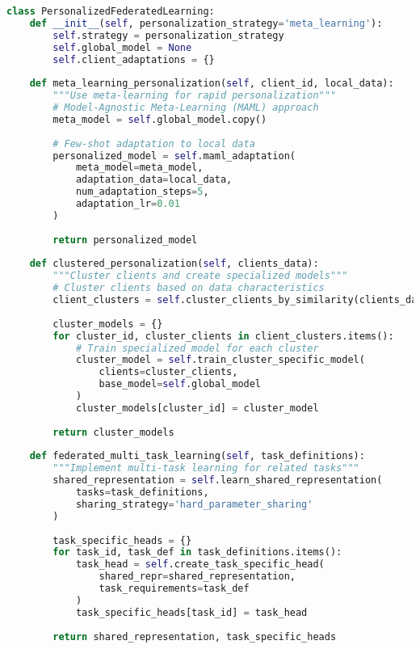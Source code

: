 \begin{lstlisting}[language=python, caption=Personalized FL Algorithm]
class PersonalizedFederatedLearning:
    def __init__(self, personalization_strategy='meta_learning'):
        self.strategy = personalization_strategy
        self.global_model = None
        self.client_adaptations = {}
        
    def meta_learning_personalization(self, client_id, local_data):
        """Use meta-learning for rapid personalization"""
        # Model-Agnostic Meta-Learning (MAML) approach
        meta_model = self.global_model.copy()
        
        # Few-shot adaptation to local data
        personalized_model = self.maml_adaptation(
            meta_model=meta_model,
            adaptation_data=local_data,
            num_adaptation_steps=5,
            adaptation_lr=0.01
        )
        
        return personalized_model
        
    def clustered_personalization(self, clients_data):
        """Cluster clients and create specialized models"""
        # Cluster clients based on data characteristics
        client_clusters = self.cluster_clients_by_similarity(clients_data)
        
        cluster_models = {}
        for cluster_id, cluster_clients in client_clusters.items():
            # Train specialized model for each cluster
            cluster_model = self.train_cluster_specific_model(
                clients=cluster_clients,
                base_model=self.global_model
            )
            cluster_models[cluster_id] = cluster_model
            
        return cluster_models
        
    def federated_multi_task_learning(self, task_definitions):
        """Implement multi-task learning for related tasks"""
        shared_representation = self.learn_shared_representation(
            tasks=task_definitions,
            sharing_strategy='hard_parameter_sharing'
        )
        
        task_specific_heads = {}
        for task_id, task_def in task_definitions.items():
            task_head = self.create_task_specific_head(
                shared_repr=shared_representation,
                task_requirements=task_def
            )
            task_specific_heads[task_id] = task_head
            
        return shared_representation, task_specific_heads
\end{lstlisting}


